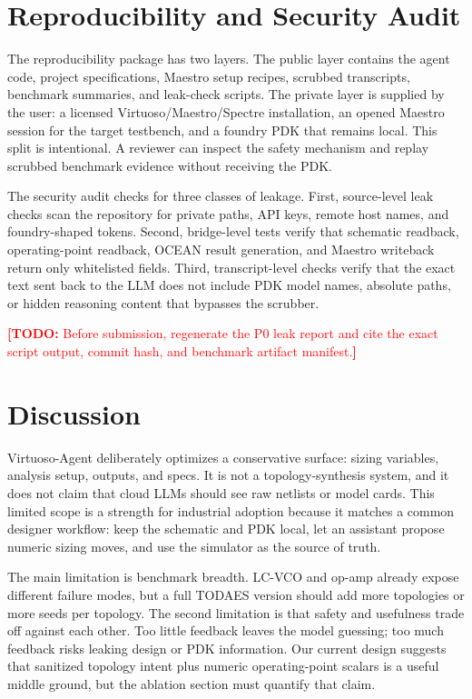 \documentclass[acmsmall,review,anonymous]{acmart}
\newcommand{\framework}{Virtuoso-Agent}
\newcommand{\todo}[1]{\textcolor{red}{\textbf{[TODO:} #1\textbf{]}}}
\begin{document}
\section{Reproducibility and Security Audit}
\label{sec:repro}

The reproducibility package has two layers. The public layer contains the
agent code, project specifications, Maestro setup recipes, scrubbed transcripts,
benchmark summaries, and leak-check scripts. The private layer is supplied by
the user: a licensed Virtuoso/Maestro/Spectre installation, an opened Maestro
session for the target testbench, and a foundry PDK that remains local. This
split is intentional. A reviewer can inspect the safety mechanism and replay
scrubbed benchmark evidence without receiving the PDK.

The security audit checks for three classes of leakage. First, source-level
leak checks scan the repository for private paths, API keys, remote host names,
and foundry-shaped tokens. Second, bridge-level tests verify that schematic
readback, operating-point readback, OCEAN result generation, and Maestro
writeback return only whitelisted fields. Third, transcript-level checks verify
that the exact text sent back to the LLM does not include PDK model names,
absolute paths, or hidden reasoning content that bypasses the scrubber.

\todo{Before submission, regenerate the P0 leak report and cite the exact
script output, commit hash, and benchmark artifact manifest.}

\section{Discussion}
\label{sec:discussion}

\framework{} deliberately optimizes a conservative surface: sizing variables,
analysis setup, outputs, and specs. It is not a topology-synthesis system, and
it does not claim that cloud LLMs should see raw netlists or model cards. This
limited scope is a strength for industrial adoption because it matches a common
designer workflow: keep the schematic and PDK local, let an assistant propose
numeric sizing moves, and use the simulator as the source of truth.

The main limitation is benchmark breadth. LC-VCO and op-amp already expose
different failure modes, but a full TODAES version should add more topologies
or more seeds per topology. The second limitation is that safety and usefulness
trade off against each other. Too little feedback leaves the model guessing;
too much feedback risks leaking design or PDK information. Our current design
suggests that sanitized topology intent plus numeric operating-point scalars
is a useful middle ground, but the ablation section must quantify that claim.
\end{document}
